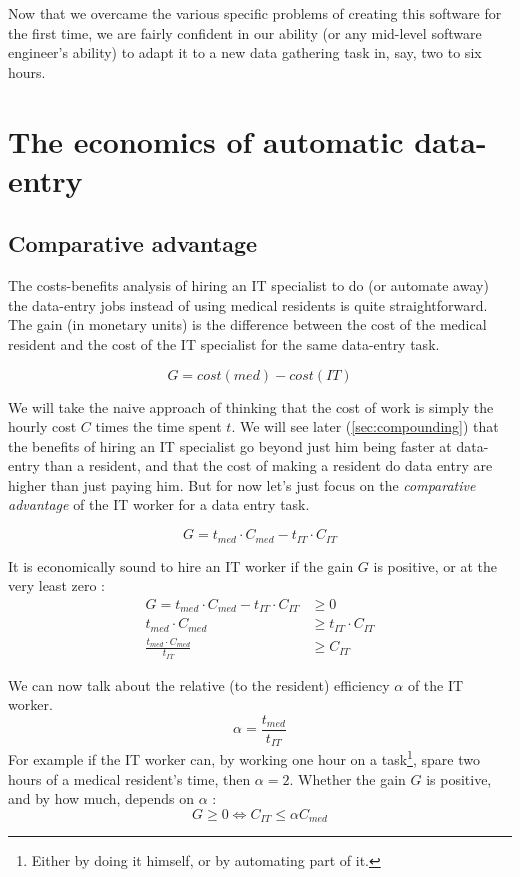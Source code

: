 \documentclass[nobib]{tufte-handout}
\begin{document}
Now that we overcame the various specific problems of creating this software for the first time, we are fairly confident in our ability (or any mid-level software engineer's ability) to adapt it to a new data gathering task in, say, two to six hours.


\section{The economics of automatic data-entry}
\label{sec:economics}

\subsection{Comparative advantage}
\label{sec:comparative}

The costs-benefits analysis of hiring an IT specialist to do (or automate away) the data-entry jobs instead of using medical residents is quite straightforward. The gain (in monetary units) is the difference between the cost of the medical resident  and the cost of the IT specialist  for the same data-entry task.

\begin{equation}
G = cost(med) - cost(IT)
\end{equation}

We will take the naive approach of thinking that the cost of work is simply the hourly cost $C$ times the time spent $t$. We will see later (\autoref{sec:compounding}) that the benefits of hiring an IT specialist go beyond just him being faster at data-entry than a resident, and that the cost of making a resident do data entry are higher than just paying him. But for now let's just focus on the \emph{comparative advantage} \cite[27-36]{economics} of the IT worker for a data entry task.

\begin{equation}
G = t_{med}\cdot C_{med} - t_{IT}\cdot C_{IT}
\end{equation}

It is economically sound to hire an IT worker if the gain $G$ is positive, or at the very least zero :
\begin{eqnarray}
G =  t_{med}\cdot C_{med} - t_{IT}\cdot C_{IT} &\geq 0\\
 t_{med}\cdot C_{med}  &\geq  t_{IT}\cdot C_{IT}\\
  \frac{t_{med}\cdot C_{med}}{t_{IT}}  &\geq C_{IT}
\end{eqnarray}

We can now talk about the relative (to the resident) efficiency $\alpha$ of the IT worker.
\begin{equation}
\alpha = \frac{t_{med}}{t_{IT}}
\end{equation}
For example if the IT worker can, by working one hour on a task\footnote{Either by doing it himself, or by automating part of it.}, spare two hours of a medical resident's time, then $\alpha=2$. Whether the gain $G$ is positive, and by how much, depends on $\alpha$ :
\begin{equation}
G \geq 0 \Leftrightarrow C_{IT} \leq \alpha C_{med}
\end{equation}
\end{document}
